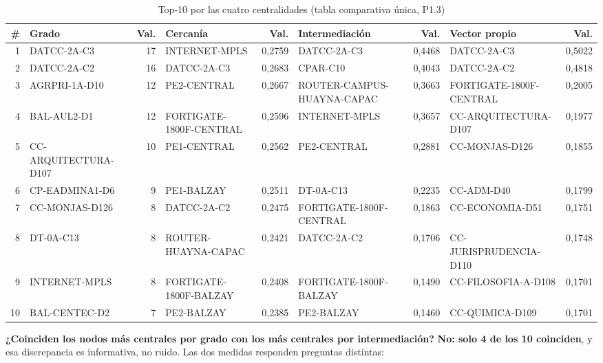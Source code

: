 \documentclass[10pt,a4paper]{extarticle}
\begin{document}
\begin{table}[H]
\centering
\caption{Top-10 por las cuatro centralidades (tabla comparativa única, P1.3)}
\label{tab:centralidades}
\scriptsize
\setlength{\tabcolsep}{2.6pt}
\begin{adjustbox}{max width=\textwidth}
\begin{tabular}{r|lr|lr|lr|lr}
\toprule
\# & \textbf{Grado} & Val. & \textbf{Cercanía} & Val. & \textbf{Intermediación} & Val. & \textbf{Vector propio} & Val. \\
\midrule
1  & DATCC-2A-C3          & 17 & INTERNET-MPLS            & 0,2759 & DATCC-2A-C3                & 0,4468 & DATCC-2A-C3            & 0,5022 \\
2  & DATCC-2A-C2          & 16 & DATCC-2A-C3              & 0,2683 & CPAR-C10                   & 0,4043 & DATCC-2A-C2            & 0,4818 \\
3  & AGRPRI-1A-D10        & 12 & PE2-CENTRAL              & 0,2667 & ROUTER-CAMPUS-HUAYNA-CAPAC & 0,3663 & FORTIGATE-1800F-CENTRAL& 0,2005 \\
4  & BAL-AUL2-D1          & 12 & FORTIGATE-1800F-CENTRAL  & 0,2596 & INTERNET-MPLS              & 0,3657 & CC-ARQUITECTURA-D107   & 0,1977 \\
5  & CC-ARQUITECTURA-D107 & 10 & PE1-CENTRAL              & 0,2562 & PE2-CENTRAL                & 0,2881 & CC-MONJAS-D126         & 0,1855 \\
6  & CP-EADMINA1-D6       &  9 & PE1-BALZAY               & 0,2511 & DT-0A-C13                  & 0,2235 & CC-ADM-D40             & 0,1799 \\
7  & CC-MONJAS-D126       &  8 & DATCC-2A-C2              & 0,2475 & FORTIGATE-1800F-CENTRAL    & 0,1863 & CC-ECONOMIA-D51        & 0,1751 \\
8  & DT-0A-C13            &  8 & ROUTER-HUAYNA-CAPAC      & 0,2421 & DATCC-2A-C2                & 0,1706 & CC-JURISPRUDENCIA-D110 & 0,1748 \\
9  & INTERNET-MPLS        &  8 & FORTIGATE-1800F-BALZAY   & 0,2408 & FORTIGATE-1800F-BALZAY     & 0,1490 & CC-FILOSOFIA-A-D108    & 0,1701 \\
10 & BAL-CENTEC-D2        &  7 & PE2-BALZAY               & 0,2385 & PE2-BALZAY                 & 0,1460 & CC-QUIMICA-D109        & 0,1701 \\
\bottomrule
\end{tabular}
\end{adjustbox}
\end{table}

\textbf{¿Coinciden los nodos más centrales por grado con los más centrales por
intermediación?} \textbf{No: solo 4 de los 10 coinciden}, y esa discrepancia es
informativa, no ruido. Las dos medidas responden preguntas distintas:
\end{document}
